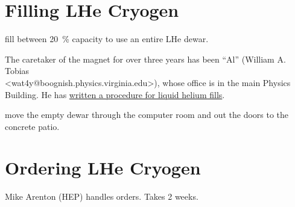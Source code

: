 \section{Filling LHe Cryogen}
\label{sec:op_maintenance:filling_lhe}

\begin{pleasedo} fill between 20~\% capacity to use an entire LHe dewar. \end{pleasedo}
The caretaker of the magnet for over three years has been ``Al'' (William A. Tobias\\<wat4y@boognish.physics.virginia.edu>), whose office is in the main Physics Building.  He has \href{papers/LHe_fill_procedure_07jun2010}{written a procedure for liquid helium fills}.
\begin{pleasedo} move the empty dewar through the computer room and out the doors to the concrete patio. \end{pleasedo}

\section{Ordering LHe Cryogen}
\label{sec:op_maintenance:ordering_lhe}

Mike Arenton (HEP) handles orders.  Takes 2 weeks.

